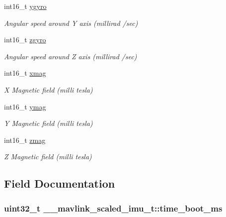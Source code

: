 \begin{DoxyCompactItemize}
int16\+\_\+t \hyperlink{struct____mavlink__scaled__imu__t_a357d16590de8334390c67ddd5d3139b3}{ygyro}
\begin{DoxyCompactList}\small\item\em Angular speed around Y axis (millirad /sec) \end{DoxyCompactList}\item 
int16\+\_\+t \hyperlink{struct____mavlink__scaled__imu__t_a907db6388e441e51dc12ca89fa6c557b}{zgyro}
\begin{DoxyCompactList}\small\item\em Angular speed around Z axis (millirad /sec) \end{DoxyCompactList}\item 
int16\+\_\+t \hyperlink{struct____mavlink__scaled__imu__t_a600200625259b8ddc5702b2116e9d619}{xmag}
\begin{DoxyCompactList}\small\item\em X Magnetic field (milli tesla) \end{DoxyCompactList}\item 
int16\+\_\+t \hyperlink{struct____mavlink__scaled__imu__t_a9a17a611fe6ec9e3f5a384cb1708e0e9}{ymag}
\begin{DoxyCompactList}\small\item\em Y Magnetic field (milli tesla) \end{DoxyCompactList}\item 
int16\+\_\+t \hyperlink{struct____mavlink__scaled__imu__t_a10577e1d6e32fc231527134352ea9587}{zmag}
\begin{DoxyCompactList}\small\item\em Z Magnetic field (milli tesla) \end{DoxyCompactList}\end{DoxyCompactItemize}


\subsection{Field Documentation}
\hypertarget{struct____mavlink__scaled__imu__t_a3bdcf7dc969ea7ca67657b1420652468}{
\subsubsection[{time\+\_\+boot\+\_\+ms}]{\setlength{\rightskip}{0pt plus 5cm}uint32\+\_\+t \+\_\+\+\_\+mavlink\+\_\+scaled\+\_\+imu\+\_\+t\+::time\+\_\+boot\+\_\+ms}}\label{struct____mavlink__scaled__imu__t_a3bdcf7dc969ea7ca67657b1420652468}


